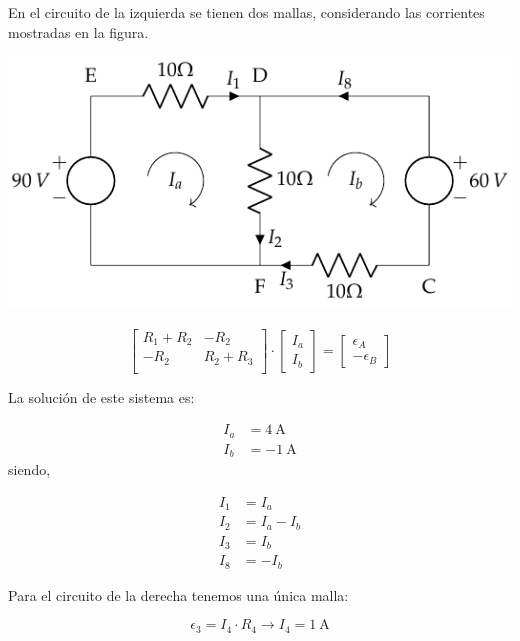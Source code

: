 En el circuito de la izquierda se tienen dos mallas, considerando las
corrientes mostradas en la figura.

\begin{center}
  \includegraphics{figuras/BT1_10_izq_mallas.pdf}
\end{center}


\begin{equation*}
  \begin{bmatrix}
    R_1 + R_2 & -R_2\\
    -R_2 & R_2 + R_3\\
  \end{bmatrix} \cdot %
  \begin{bmatrix}
    I_a\\
    I_b
  \end{bmatrix} = %
  \begin{bmatrix}
    \epsilon_A\\
    -\epsilon_B
  \end{bmatrix}
\end{equation*}

La solución de este sistema es:

\begin{align*}
  I_a &= \qty{4}{\ampere}\\
  I_b &= \qty{-1}{\ampere}
\end{align*}
siendo,

\begin{align*}
  I_1 &= I_a\\
  I_2 &= I_a - I_b\\
  I_3 &= I_b\\
  I_8 &= -I_b
\end{align*}

Para el circuito de la derecha tenemos una única malla:

\begin{equation*}
  \epsilon_3 = I_4 \cdot R_4 \rightarrow I_4 = \qty{1}{\ampere}
\end{equation*}

